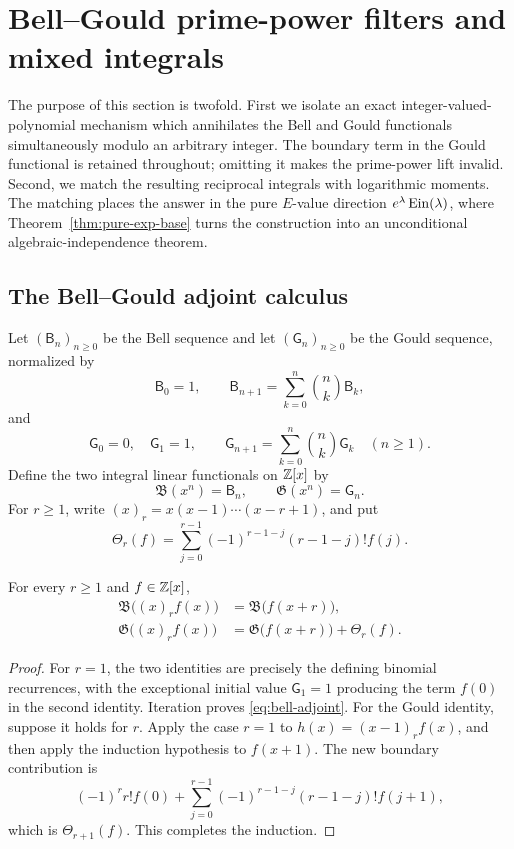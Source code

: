 \section{Bell--Gould prime-power filters and mixed integrals}
\label{sec:touchard-mixed}

The purpose of this section is twofold.  First we isolate an exact
integer-valued-polynomial mechanism which annihilates the Bell and Gould
functionals simultaneously modulo an arbitrary integer.  The boundary term
in the Gould functional is retained throughout; omitting it makes the
prime-power lift invalid.  Second, we match the resulting reciprocal
integrals with logarithmic moments.  The matching places the answer in the
pure \(E\)-value direction \(e^\lambda\operatorname{Ein}(\lambda)\), where
Theorem~\ref{thm:pure-exp-base} turns the construction into an unconditional
algebraic-independence theorem.

\subsection{The Bell--Gould adjoint calculus}

Let \((\mathsf B_n)_{n\geq0}\) be the Bell sequence and let
\((\mathsf G_n)_{n\geq0}\) be the Gould sequence, normalized by
\[
 \mathsf B_0=1,
 \qquad
 \mathsf B_{n+1}=\sum_{k=0}^n\binom nk\mathsf B_k,
\]
and
\[
 \mathsf G_0=0,
 \quad \mathsf G_1=1,
 \qquad
 \mathsf G_{n+1}=\sum_{k=0}^n\binom nk\mathsf G_k
 \quad(n\geq1).
\]
Define the two integral linear functionals on \(\mathbb Z[x]\) by
\[
 \mathfrak B(x^n)=\mathsf B_n,
 \qquad
 \mathfrak G(x^n)=\mathsf G_n.
\]
For \(r\geq1\), write
\((x)_r=x(x-1)\cdots(x-r+1)\), and put
\begin{equation}\label{eq:touchard-theta}
 \Theta_r(f)=
 \sum_{j=0}^{r-1}(-1)^{r-1-j}(r-1-j)!f(j).
\end{equation}

\begin{lemma}
\label{lem:bell-gould-adjoints}
For every \(r\geq1\) and \(f\in\mathbb Z[x]\),
\begin{align}
 \mathfrak B\bigl((x)_rf(x)\bigr)
   &=\mathfrak B\bigl(f(x+r)\bigr),
   \label{eq:bell-adjoint}\\
 \mathfrak G\bigl((x)_rf(x)\bigr)
   &=\mathfrak G\bigl(f(x+r)\bigr)+\Theta_r(f).
   \label{eq:gould-adjoint}
\end{align}
\end{lemma}

\begin{proof}
For \(r=1\), the two identities are precisely the defining binomial
recurrences, with the exceptional initial value \(\mathsf G_1=1\) producing
the term \(f(0)\) in the second identity.  Iteration proves
\eqref{eq:bell-adjoint}.  For the Gould identity, suppose it holds for
\(r\).  Apply the case \(r=1\) to
\(h(x)=(x-1)_rf(x)\), and then apply the induction hypothesis to
\(f(x+1)\).  The new boundary contribution is
\[
 (-1)^rr!f(0)+
 \sum_{j=0}^{r-1}(-1)^{r-1-j}(r-1-j)!f(j+1),
\]
which is \(\Theta_{r+1}(f)\).  This completes the induction.
\end{proof}

